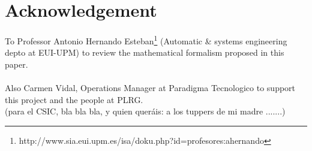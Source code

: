 \newpage

\section{Acknowledgement}

To Professor Antonio Hernando Esteban\footnote{http://www.sia.eui.upm.es/isa/doku.php?id=profesores:ahernando}  (Automatic \& systems engineering depto at EUI-UPM) to review the mathematical formalism proposed in this paper.
\\
\\
Also Carmen Vidal, Operations Manager at Paradigma Tecnologico to support this project and the people at PLRG.
\\
(para el CSIC, bla bla bla, y quien queráis: a los tuppers de mi madre .......)